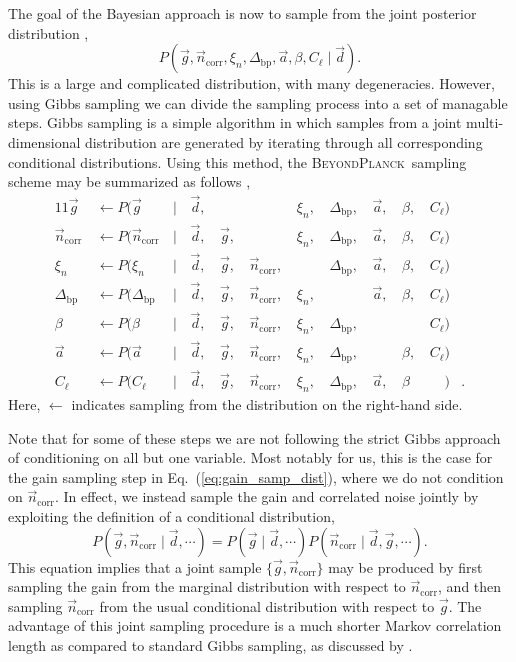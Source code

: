 \documentclass[twocolumn]{aa}
\renewcommand{\d}[0]{\vec{d}}
\newcommand{\n}[0]{\vec{n}}
\renewcommand{\a}[0]{\vec{a}}
\newcommand{\g}[0]{\vec{g}}
\newcommand{\BP}{\textsc{BeyondPlanck}}
\begin{document}
The goal of the Bayesian approach is now to sample from the joint posterior distribution ,
\begin{equation}\label{eq:full_distribution}
	P(\g, \n_{\mathrm{corr}}, \xi_n,\Delta_\mathrm{bp}, \a, \beta, C_{\ell}\mid\d). 
\end{equation}
This is a large and complicated distribution, with many
degeneracies. However, using Gibbs sampling we can divide the sampling
process into a set of managable steps. Gibbs sampling is a simple
algorithm in which samples from a joint multi-dimensional
distribution are generated by iterating through all corresponding
conditional distributions. Using this method, the \BP\ sampling scheme may be summarized as follows \citep{bp01},
\begin{alignat}{11}
\label{eq:gain_samp_dist}\g &\,\leftarrow P(\g&\,|&\,\d,&\, & &\,\xi_n, 
&\,\Delta_\mathrm{bp}, &\,\a, &\,\beta, &\,C_{\ell})\\
\label{eq:ncorr_samp_dist} \n_{\mathrm{corr}} &\,\leftarrow P(\n_{\mathrm{corr}}&\,|&\,\d, &\,\g, &\,&\,\xi_n, 
&\,\Delta_\mathrm{bp}, &\,\a, &\,\beta, &\,C_{\ell})\\ 
\label{eq:xi_samp_dist} \xi_n &\,\leftarrow P(\xi_n&\,|&\,\d, &\,\g, &\,\n_{\mathrm{corr}}, &\,
&\,\Delta_\mathrm{bp}, &\,\a, &\,\beta, &\,C_{\ell})\\
\Delta_\mathrm{bp} &\,\leftarrow P(\Delta_\mathrm{bp}&\,|&\,\d, &\,\g, &\,\n_{\mathrm{corr}}, &\,\xi_n, 
&\,&\,\a, &\,\beta, &\,C_{\ell})\\
\beta &\,\leftarrow P(\beta&\,|&\,\d, &\,\g, &\,\n_{\mathrm{corr}}, &\,\xi_n, 
&\,\Delta_\mathrm{bp}, & &\,&\,C_{\ell})\\
\a &\,\leftarrow P(\a&\,|&\,\d, &\,\g, &\,\n_{\mathrm{corr}}, &\,\xi_n, 
&\,\Delta_\mathrm{bp}, &\,&\,\beta, &\,C_{\ell})\\
C_{\ell} &\,\leftarrow P(C_{\ell}&\,\mid &\,\d, &\,\g, &\,\n_{\mathrm{corr}}, &\,\xi_n, &\,\Delta_\mathrm{bp}, &\,\a, &\,\beta&\,\phantom{C_{\ell}})&.
\end{alignat}
Here, $\leftarrow$ indicates sampling from the distribution on the
right-hand side. 

Note that for some of these steps we are not following the strict
Gibbs approach of conditioning on all but one variable. Most notably
for us, this is the case for the gain sampling step in
Eq.~(\ref{eq:gain_samp_dist}), where we do not condition on
$\n_\mathrm{corr}$. In effect, we instead sample the gain and
correlated noise jointly by exploiting the definition of a conditional distribution,
\begin{equation}
	P(\g, \n_{\mathrm{corr}}\mid\d, \cdots) = P(\g\mid\d, \cdots)P(\n_{\mathrm{corr}}\mid\d,\g, \cdots).
\end{equation}
This equation implies that a joint sample $\{\g,\n_{\mathrm{corr}}\}$
may be produced by first sampling the gain from the marginal
distribution with respect to $\n_\mathrm{corr}$, and then sampling
$\n_\mathrm{corr}$ from the usual conditional distribution with
respect to $\g$. The advantage of this joint sampling procedure is a
much shorter Markov correlation length as compared to standard Gibbs
sampling, as discussed by \citet{bp09}.
\end{document}
